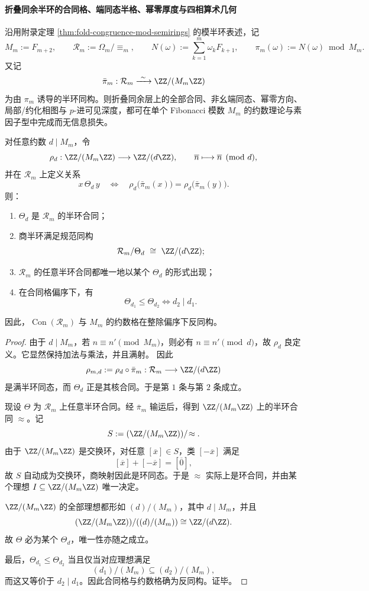 \paragraph{折叠同余半环的合同格、端同态半格、幂零厚度与四相算术几何}
沿用附录定理 \ref{thm:fold-congruence-mod-semirings} 的模半环表述，记
\[
M_m:=F_{m+2},
\qquad
\mathcal R_m:=\Omega_m/\!\equiv_m,
\qquad
N(\omega):=\sum_{k=1}^{m}\omega_kF_{k+1},
\qquad
\pi_m(\omega):=N(\omega)\bmod M_m.
\]
又记
\[
\bar\pi_m:\mathcal R_m\xrightarrow{\ \sim\ }\ZZ/(M_m\ZZ)
\]
为由 \(\pi_m\) 诱导的半环同构。则折叠同余层上的全部合同、非幺端同态、幂零方向、局部/约化相图与 \(p\)-进可见深度，都可在单个 Fibonacci 模数 \(M_m\) 的约数理论与素因子型中完成而无信息损失。

\begin{theorem}\label{thm:xi-fold-congruence-quotient-divisor-lattice}
对任意约数 \(d\mid M_m\)，令
\[
\rho_d:\ZZ/(M_m\ZZ)\longrightarrow \ZZ/(d\ZZ),
\qquad
\overline n\longmapsto \overline n \pmod d,
\]
并在 \(\mathcal R_m\) 上定义关系
\[
x\,\Theta_d\,y
\quad\Longleftrightarrow\quad
\rho_d\!\bigl(\bar\pi_m(x)\bigr)=\rho_d\!\bigl(\bar\pi_m(y)\bigr).
\]
则：
\begin{enumerate}
  \item \(\Theta_d\) 是 \(\mathcal R_m\) 的半环合同；
  \item 商半环满足规范同构
  \[
  \mathcal R_m/\Theta_d\ \cong\ \ZZ/(d\ZZ);
  \]
  \item \(\mathcal R_m\) 的任意半环合同都唯一地以某个 \(\Theta_d\) 的形式出现；
  \item 在合同格偏序下，有
  \[
  \Theta_{d_1}\le \Theta_{d_2}
  \iff
  d_2\mid d_1.
  \]
\end{enumerate}
因此，\(\operatorname{Con}(\mathcal R_m)\) 与 \(M_m\) 的约数格在整除偏序下反同构。
\end{theorem}
\begin{proof}
由于 \(d\mid M_m\)，若 \(n\equiv n'\pmod{M_m}\)，则必有 \(n\equiv n'\pmod d\)，故 \(\rho_d\) 良定义。它显然保持加法与乘法，并且满射。
因此
\[
\rho_{m,d}:=\rho_d\circ\bar\pi_m:\mathcal R_m\longrightarrow \ZZ/(d\ZZ)
\]
是满半环同态，而 \(\Theta_d\) 正是其核合同。于是第 \(1\) 条与第 \(2\) 条成立。

现设 \(\Theta\) 为 \(\mathcal R_m\) 上任意半环合同。经 \(\bar\pi_m\) 输运后，得到 \(\ZZ/(M_m\ZZ)\) 上的半环合同 \(\approx\)。记
\[
S:=(\ZZ/(M_m\ZZ))/\!\approx.
\]
由于 \(\ZZ/(M_m\ZZ)\) 是交换环，对任意 \([\overline x]\in S\)，类 \([-\overline x]\) 满足
\[
[\overline x]+[-\overline x]=[\overline 0],
\]
故 \(S\) 自动成为交换环，商映射因此是环同态。于是 \(\approx\) 实际上是环合同，并由某个理想 \(I\subseteq \ZZ/(M_m\ZZ)\) 唯一决定。

\(\ZZ/(M_m\ZZ)\) 的全部理想都形如 \((d)/(M_m)\)，其中 \(d\mid M_m\)，并且
\[
(\ZZ/(M_m\ZZ))/((d)/(M_m))
\cong
\ZZ/(d\ZZ).
\]
故 \(\Theta\) 必为某个 \(\Theta_d\)，唯一性亦随之成立。

最后，\(\Theta_{d_1}\le \Theta_{d_2}\) 当且仅当对应理想满足
\[
(d_1)/(M_m)\subseteq (d_2)/(M_m),
\]
而这又等价于 \(d_2\mid d_1\)。因此合同格与约数格确为反同构。证毕。
\end{proof}

